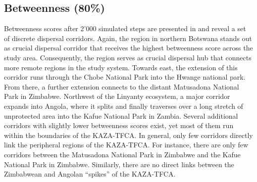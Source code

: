 \documentclass[abstract=on,10pt,a4paper,bibliography=totocnumbered]{article}
\begin{document}
\subsection{Betweenness (80\%)}
Betweenness scores after 2'000 simulated steps are presented in
 and reveal a set of discrete dispersal corridors. Again, the
region in northern Botswana stands out as crucial dispersal corridor that
receives the highest betweenness score across the study area. Consequently, the
region serves as crucial dispersal hub that connects more remote regions in the
study system. Towards east, the extension of this corridor runs through the
Chobe National Park into the Hwange national park. From there, a further
extension connects to the distant Matusadona National Park in Zimbabwe.
Northwest of the Linyanty ecosystem, a major corridor expands into Angola, where
it splits and finally traverses over a long stretch of unprotected area into the
Kafue National Park in Zambia. Several additional corridors with slightly lower
betweenness scores exist, yet most of them run within the boundaries of the
KAZA-TFCA. In general, only few corridors directly link the peripheral regions
of the KAZA-TFCA. For instance, there are only few corridors between the
Matusadona National Park in Zimbabwe and the Kafue National Park in Zimbabwe.
Similarly, there are no direct links between the Zimbabwean and Angolan
``spikes'' of the KAZA-TFCA.
\end{document}
